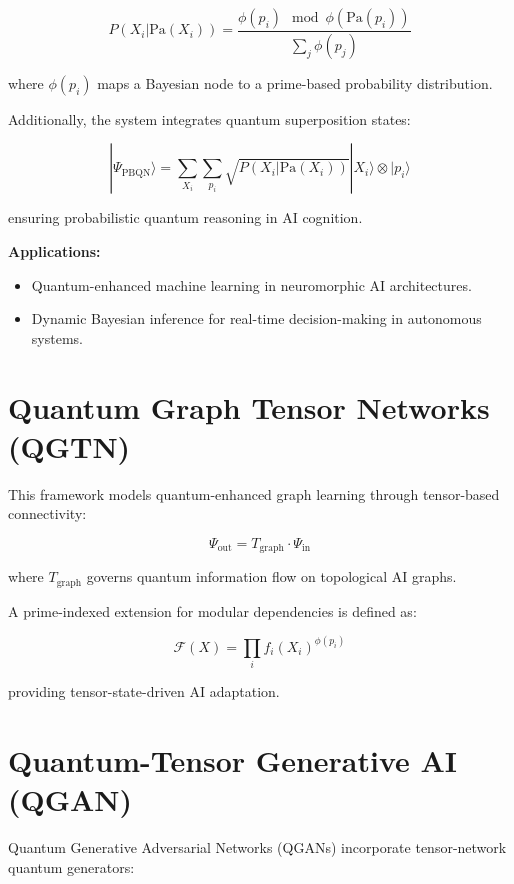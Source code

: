 \documentclass{article}
\theoremstyle{plain}
\begin{document}
\begin{equation}
P(X_i | \text{Pa}(X_i)) = \frac{\phi(p_i) \mod \phi(\text{Pa}(p_i))}{\sum_{j} \phi(p_j)}
\end{equation}

where \( \phi(p_i) \) maps a Bayesian node to a prime-based probability distribution.

Additionally, the system integrates quantum superposition states:

\begin{equation}
|\Psi_{\text{PBQN}} \rangle = \sum_{X_i} \sum_{p_i} \sqrt{P(X_i | \text{Pa}(X_i))} |X_i\rangle \otimes |p_i\rangle
\end{equation}

ensuring probabilistic quantum reasoning in AI cognition.

\textbf{Applications:}
\begin{itemize}
    \item Quantum-enhanced machine learning in neuromorphic AI architectures.
    \item Dynamic Bayesian inference for real-time decision-making in autonomous systems.
\end{itemize}
\section{Quantum Graph Tensor Networks (QGTN)}
This framework models quantum-enhanced graph learning through tensor-based connectivity:

\begin{equation}
\Psi_{\text{out}} = T_{\text{graph}} \cdot \Psi_{\text{in}}
\end{equation}

where \(T_{\text{graph}}\) governs quantum information flow on topological AI graphs.

A prime-indexed extension for modular dependencies is defined as:

\begin{equation}
\mathcal{F}(X) = \prod_{i} f_i (X_i)^{\phi(p_i)}
\end{equation}

providing tensor-state-driven AI adaptation.

\section{Quantum-Tensor Generative AI (QGAN)}
Quantum Generative Adversarial Networks (QGANs) incorporate tensor-network quantum generators:
\end{document}
